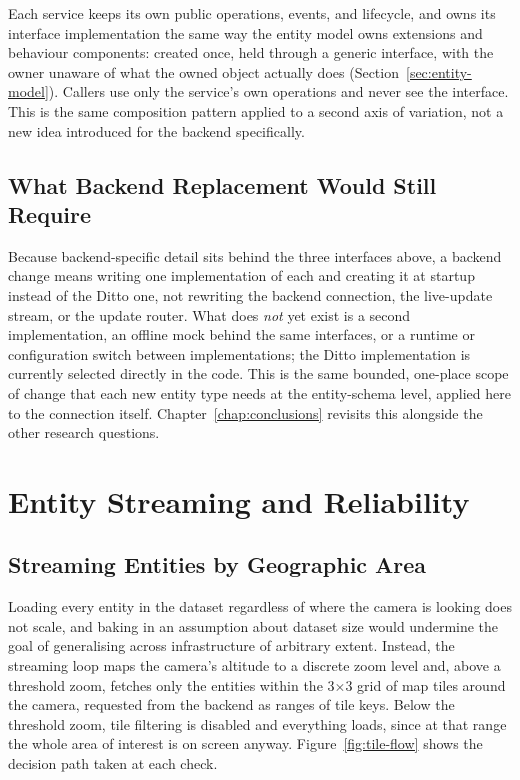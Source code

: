 Each service keeps its own public operations, events, and lifecycle, and owns its interface implementation the same way the entity model owns extensions and behaviour components: created once, held through a generic interface, with the owner unaware of what the owned object actually does (Section~\ref{sec:entity-model}). Callers use only the service's own operations and never see the interface. This is the same composition pattern applied to a second axis of variation, not a new idea introduced for the backend specifically.

\subsection{What Backend Replacement Would Still Require}
\label{sec:impl-replace-caveat}

Because backend-specific detail sits behind the three interfaces above, a backend change means writing one implementation of each and creating it at startup instead of the Ditto one, not rewriting the backend connection, the live-update stream, or the update router. What does \emph{not} yet exist is a second implementation, an offline mock behind the same interfaces, or a runtime or configuration switch between implementations; the Ditto implementation is currently selected directly in the code. This is the same bounded, one-place scope of change that each new entity type needs at the entity-schema level, applied here to the connection itself. Chapter~\ref{chap:conclusions} revisits this alongside the other research questions.

\section{Entity Streaming and Reliability}
\label{sec:impl-streaming}

\subsection{Streaming Entities by Geographic Area}

Loading every entity in the dataset regardless of where the camera is looking does not scale, and baking in an assumption about dataset size would undermine the goal of generalising across infrastructure of arbitrary extent. Instead, the streaming loop maps the camera's altitude to a discrete zoom level and, above a threshold zoom, fetches only the entities within the 3$\times$3 grid of map tiles around the camera, requested from the backend as ranges of tile keys. Below the threshold zoom, tile filtering is disabled and everything loads, since at that range the whole area of interest is on screen anyway. Figure~\ref{fig:tile-flow} shows the decision path taken at each check.

